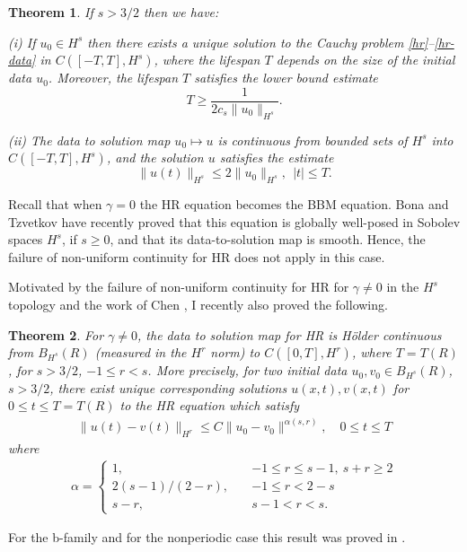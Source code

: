 \documentclass[12pt,reqno]{amsart}
\newtheorem{theorem}{Theorem}
\begin{document}
\begin{theorem}
\label{thm:HR_existence_continuous_dependence}
If   $s>3/2$  then we have:

(i) If $u_0\in H^s$  then  there exists a unique solution to
the Cauchy problem  \eqref{hr}--\eqref{hr-data} in $C([-T, T], H^s)$, where 
the lifespan  $T$ depends on the size
of the initial data $u_0$. Moreover, 
the  lifespan $T$ satisfies the lower bound estimate 
%
%
%
\begin{equation}
\label{Life-span-est}
T
\ge
\frac{1}{2c_s \|u_0\|_{H^s}}.
\end{equation}
%

(ii)
The data to solution map $u_0 \mapsto u$ is continuous from
bounded sets of $H^s$ into \\ $C([-T, T], H^s)$,
and the solution $u$ satisfies the estimate
%
%
%
\begin{equation}
\label{u_x-Linfty-Hs}
\|
u(t)
\|_ {H^s}
\le
2
\|
u_0
\|_{H^s}, \ \ |t|\le T.
\end{equation}
%
%
%
\end{theorem}

Recall that when  $\gamma=0$ the HR equation becomes the BBM
equation.  Bona and Tzvetkov \cite{Bona_2009_Sharp-well-pose} have recently
proved  that this equation  is globally well-posed in  Sobolev spaces $H^s$, if
$s \ge 0$, and that its data-to-solution map is smooth. Hence, the failure of
non-uniform continuity for HR does not apply in this case. 

Motivated by the failure of non-uniform continuity for HR for $\gamma \neq 0$ in
the $H^{s}$ topology and the work of Chen \cite{Chen:2011fk}, I recently also proved the following.
%
%
\begin{theorem}
For $\gamma \neq 0$, the
data to solution map for HR is H\"older continuous from $B_{H^{s}}(R)$ (measured in the $H^{r}$ norm)
to $C([0, T], H^{r})$, where $T = T(R)$, for $s >
3/2$, $-1 \le r < s$. 
%
More precisely, for two initial data $u_{0}, v_{0} \in B_{H^{s}}(R)$, $s > 3/2$, there exist unique
corresponding solutions $u(x,t), v(x,t)$ for $0 \le t \le T= T(R)$ to the
HR equation which satisfy 
%
%
\begin{equation*}
\begin{split}
  \| u(t) - v(t) \|_{H^{r}} \le C \| u_{0} - v_{0} \|^{\alpha(s, r)},
  \quad 0
  \le t \le T
\end{split}
\end{equation*}
%
%
where  
%
%
\begin{equation*}
\begin{split}
\alpha = 
\begin{cases}
    1,  \quad  & -1 \le r \le s-1, \ s + r \ge 2  
  \\
  2(s-1)/(2-r), \quad  &  -1 \le r < 2-s 
  \\
  s-r, \quad  & s-1 < r < s. 
\end{cases}
\end{split}
\end{equation*}
\label{thm:main-thm}
\end{theorem}
For the b-family and for the nonperiodic case this result
was proved in \cite{Chen:2011fk}.
\end{document}
